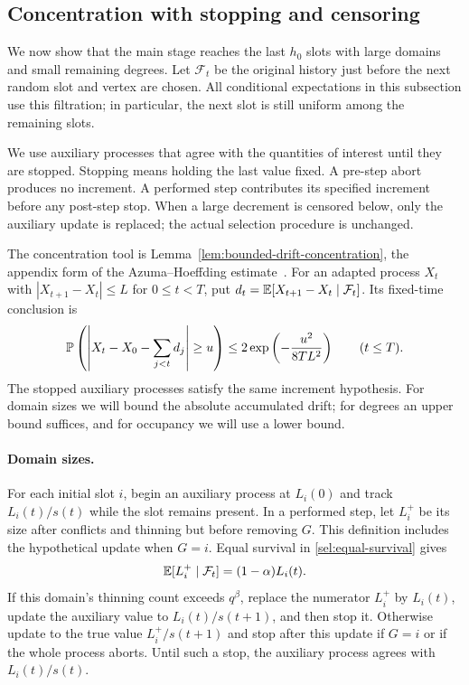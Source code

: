 \subsection{Concentration with stopping and censoring}

We now show that the main stage reaches the last $h_0$ slots with
large domains and small remaining degrees.  Let $\mathcal F_t$ be the
original history just before the next random slot and vertex are
chosen.  All conditional expectations in this subsection use this
filtration; in particular, the next slot is still uniform among the
remaining slots.

We use auxiliary processes that agree with the quantities of interest
until they are stopped.  Stopping means holding the last value fixed.
A pre-step abort produces no increment.  A performed step contributes
its specified increment before any post-step stop.  When a large
decrement is censored below, only the auxiliary update is replaced;
the actual selection procedure is unchanged.

The concentration tool is Lemma~\ref{lem:bounded-drift-concentration},
the appendix form of the Azuma--Hoeffding estimate~\cite{Azuma1967}.
For an adapted process $X_t$ with $|X_{t+1}-X_t|\le L$ for
$0\le t<T$, put
$d_t=\mathbb E[X_{t+1}-X_t\mid\mathcal F_t]$.  Its fixed-time conclusion is
\begin{equation}\label{sel:azuma}
 \mathbb P\left(\left|X_t-X_0-\sum_{j<t}d_j\right|\ge u\right)
 \le 2\exp\left(-\frac{u^2}{8TL^2}\right)
 \qquad(t\le T).
\end{equation}
The stopped auxiliary processes satisfy the same increment
hypothesis.  For domain sizes we will bound the absolute accumulated
drift; for degrees an upper bound suffices, and for occupancy we will
use a lower bound.

\paragraph{Domain sizes.}
For each initial slot $i$, begin an auxiliary process at $L_i(0)$
and track $L_i(t)/s(t)$ while the slot remains present.  In a
performed step, let $L_i^+$ be its size after conflicts and thinning
but before removing $G$.  This definition includes the hypothetical
update when $G=i$.  Equal survival in \eqref{sel:equal-survival} gives
\begin{equation}\label{sel:size-expectation}
 \mathbb E[L_i^+\mid\mathcal F_t]=(1-\alpha)L_i(t).
\end{equation}
If this domain's thinning count exceeds $q^\beta$, replace the
numerator $L_i^+$ by $L_i(t)$, update the auxiliary value to
$L_i(t)/s(t+1)$, and then stop it.  Otherwise update to the true
value $L_i^+/s(t+1)$ and stop after this update if $G=i$ or if the
whole process aborts.  Until such a stop, the auxiliary process
agrees with $L_i(t)/s(t)$.

